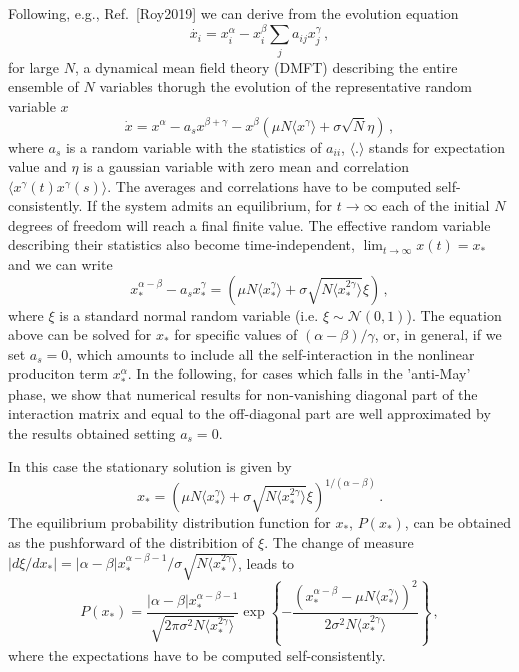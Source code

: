\documentclass[%
 reprint,
 amsmath,amssymb,
 aps,
]{revtex4-2}
\begin{document}
Following, e.g., Ref.~[Roy2019] we can derive from 
the evolution equation
\begin{equation}
    \dot{x_i}=x_i^{\alpha} - x_i^{\beta}\sum_{j}a_{ij}x_j^{\gamma} \, ,
\label{eq: full abg}
\end{equation}
for large $N$, a dynamical mean field theory (DMFT) 
describing the entire ensemble of $N$ variables
thorugh the evolution of the representative random variable $x$
\begin{equation}
    \dot{x} = x^{\alpha}-a_sx^{\beta+\gamma}-x^{\beta}\left( \mu N \langle x^{\gamma}\rangle + \sigma \sqrt{N} \eta\right) \, ,
\label{eq: dmft}
\end{equation}
where $a_s$ is a random variable with the statistics of $a_{ii}$,
$\langle . \rangle$ stands for expectation value
and $\eta$ is a gaussian variable
with zero mean and correlation 
$\langle x^{\gamma}(t)x^{\gamma}(s)\rangle$. 
The averages and correlations have to be computed self-consistently.
If the system admits an equilibrium, for 
$t\to\infty$ each of the initial $N$ degrees 
of freedom will reach a final finite value. 
The effective random variable describing their statistics
also become time-independent,
$\lim_{t\to\infty}x(t)=x_*$ and we can write
\begin{equation}
    x_*^{\alpha-\beta} - a_s x_*^{\gamma}= \left( \mu N \langle x_*^{\gamma}\rangle + \sigma \sqrt{N\langle x_*^{2\gamma}\rangle}\xi\right) \, ,
\end{equation} 
where $\xi$ is a standard normal random variable (i.e. $\xi\sim\mathcal{N}(0,1)$).
The equation above can be solved for $x_*$ for specific values of
$(\alpha-\beta)/\gamma$, or, in general, if we set $a_s=0$, which amounts to include
all the self-interaction in the nonlinear produciton term
$x_*^{\alpha}$. In the following, for cases which
falls in the 'anti-May' phase, we show that numerical results
for non-vanishing diagonal part of the
interaction matrix and equal to the
off-diagonal part are well approximated by the results obtained
setting $a_s=0$.

In this case the stationary solution is given by 
\begin{equation} \label{eq: cavity solution}
    x_* = \left( \mu N \langle x_*^{\gamma}\rangle + \sigma \sqrt{N\langle x_*^{2\gamma}\rangle}\xi\right)^{1/(\alpha-\beta)} \, .
\end{equation}
The equilibrium probability distribution function for $x_*$, $P(x_*)$,
can be obtained as the pushforward of the distribition of $\xi$.
The change of measure
$\left|d \xi/d x_*\right|=|\alpha-\beta|x_*^{\alpha-\beta-1}/\sigma \sqrt{N\langle x_*^{2\gamma}\rangle}$,
leads to
\begin{equation}\label{eq: dist general}
    P(x_*)=\frac{|\alpha-\beta|x_*^{\alpha-\beta-1}}{\sqrt{2\pi\sigma^2 N\langle x_*^{2\gamma}\rangle}}
    \exp{\left\{-\frac{(x_*^{\alpha-\beta}-\mu N\langle x_*^{\gamma}\rangle)^2}{2\sigma^2N\langle x_*^{2\gamma}\rangle}\right\}} \, ,
\end{equation}
where the expectations have to be computed self-consistently.
\end{document}
